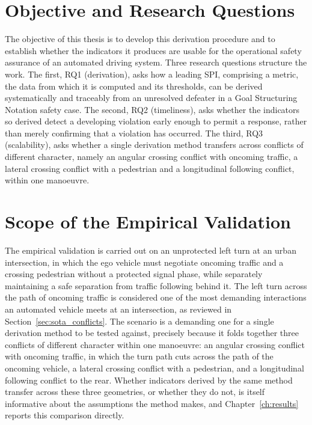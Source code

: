 \section{Objective and Research Questions}
\label{sec:intro_objective}

The objective of this thesis is to develop this derivation procedure and to establish
whether the indicators it produces are usable for the operational safety assurance of
an automated driving system. Three research questions structure the work. The first,
RQ1 (derivation), asks how a leading \ac{SPI}, comprising a metric, the data from which it is computed
and its thresholds, can be derived systematically and traceably from an unresolved defeater in a
Goal Structuring Notation safety case. The second, RQ2 (timeliness), asks whether the indicators so
derived detect a developing violation early enough to permit a response, rather than
merely confirming that a violation has occurred. The third, RQ3 (scalability), asks whether a single
derivation method transfers across conflicts of different character, namely an
angular crossing conflict with oncoming traffic, a lateral crossing conflict with a
pedestrian and a longitudinal following conflict, within one manoeuvre.

\section{Scope of the Empirical Validation}
\label{sec:intro_scope}

The empirical validation is carried out on an unprotected left turn at an urban
intersection, in which the ego vehicle must negotiate oncoming traffic and a crossing
pedestrian without a protected signal phase, while separately maintaining a safe
separation from traffic following behind it. The left turn across the path of oncoming traffic is considered
one of the most demanding interactions an automated vehicle meets at an
intersection, as reviewed in Section~\ref{sec:sota_conflicts}. The scenario is a demanding one for a single
derivation method to be tested against, precisely because it folds together three
conflicts of different character within one manoeuvre: an angular crossing conflict
with oncoming traffic, in which the turn path cuts across the path of the oncoming
vehicle, a lateral crossing conflict with a pedestrian, and a longitudinal following
conflict to the rear. Whether indicators derived by the same method transfer across
these three geometries, or whether they do not, is itself informative about the
assumptions the method makes, and Chapter~\ref{ch:results} reports this comparison
directly.

